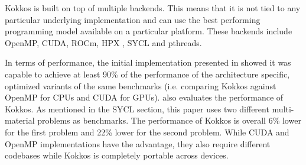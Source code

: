 Kokkos is built on top of multiple backends. This means that it is not tied to any particular underlying implementation and can use the best performing programming model available on a particular platform. These backends include OpenMP, CUDA, ROCm, HPX \cite{hpx}, SYCL and pthreads.

In terms of performance, the initial implementation presented in \cite{kokkos} showed it was capable to achieve at least 90\% of the performance of the architecture specific, optimized variants of the same benchmarks (i.e. comparing Kokkos against OpenMP for CPUs and CUDA for GPUs). \cite{performance_portability_multimaterial_kernels} also evaluates the performance of Kokkos. As mentioned in the SYCL section, this paper uses two different multi-material problems as benchmarks. The performance of Kokkos is overall 6\% lower for the first problem and 22\% lower for the second problem. While CUDA and OpenMP implementations have the advantage, they also require different codebases while Kokkos is completely portable across devices.
